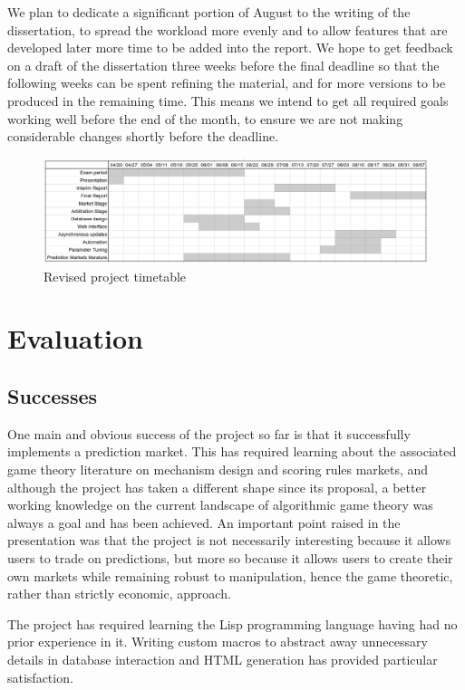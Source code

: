 \documentclass[10pt,a4paper]{article}
\theoremstyle{plain}
\theoremstyle{definition}
\begin{document}
We plan to dedicate a significant portion of August to the writing of the
dissertation, to spread the workload more evenly and to allow features that are
developed later more time to be added into the report.  We hope to get feedback
on a draft of the dissertation three weeks before the final deadline so that
the following weeks can be spent refining the material, and for more versions
to be produced in the remaining time. This means we intend to get all required
goals working well before the end of the month, to ensure we are not making
considerable changes shortly before the deadline.

\begin{figure}[h]
	\centering
	\includegraphics[width=\textwidth]{new-schedule}
	\caption{Revised project timetable}
	\label{fig:new-schedule}
\end{figure}

\section{Evaluation}

\label{sec:evaluation}

\subsection{Successes}

One main and obvious success of the project so far is that it successfully
implements a prediction market. This has required learning about the associated
game theory literature on mechanism design and scoring rules markets, and
although the project has taken a different shape since its proposal, a better
working knowledge on the current landscape of algorithmic game theory was
always a goal and has been achieved. An important point raised in the
presentation was that the project is not necessarily interesting because it
allows users to trade on predictions, but more so because it allows users to
create their own markets while remaining robust to manipulation, hence the game
theoretic, rather than strictly economic, approach.

The project has required learning the Lisp programming language having had no
prior experience in it. Writing custom macros to abstract away unnecessary
details in database interaction and HTML generation has provided particular
satisfaction.
\end{document}
